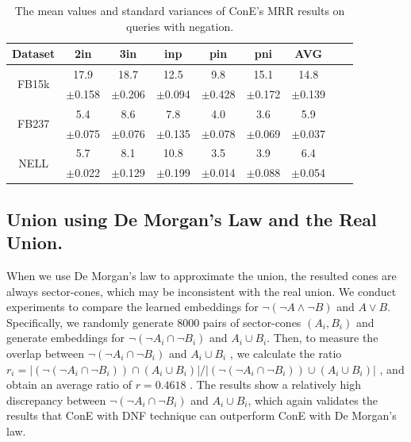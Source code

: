 \documentclass{article}
\newcommand{\std}[1]{\tiny{$\pm$#1}}
\begin{document}
\begin{table}[ht]
    \centering
    \caption{The mean values and standard variances of ConE's MRR results on queries with negation.}
    \label{table:errorbar_neg}
    \vspace{1mm}
    \begin{tabular}{ c  c c c c  c c c c }
        \toprule
         \textbf{Dataset}  &\textbf{2in} &\textbf{3in} &\textbf{inp} &\textbf{pin} &\textbf{pni} &\textbf{AVG}\\
        \midrule
        \multirow{2}{*}{FB15k} 
        &17.9 &18.7 &12.5 &9.8 &15.1 &14.8\\
        &\std{0.158} &\std{0.206} &\std{0.094} &\std{0.428} &\std{0.172} &\std{0.139}\\
        \midrule
        \multirow{2}{*}{FB237}
        &5.4 &8.6 &7.8 &4.0 &3.6 &5.9\\
        &\std{0.075} &\std{0.076} &\std{0.135} &\std{0.078} &\std{0.069} &\std{0.037}\\
        \midrule
        \multirow{2}{*}{NELL} 
        &5.7 &8.1 &10.8 &3.5 &3.9 &6.4\\
        &\std{0.022} &\std{0.129} &\std{0.199} &\std{0.014} &\std{0.088} &\std{0.054}\\
        \bottomrule
    \end{tabular}
    
\end{table}


\subsection{Union using De Morgan's Law and the Real Union.}
When we use De Morgan's law to approximate the union, the resulted cones are always sector-cones, which may be inconsistent with the real union. We conduct experiments to compare the learned embeddings for $\neg (\neg A\land \neg B)$  and $A\lor B$. Specifically, we randomly generate $8000$  pairs of sector-cones $(A_i, B_i)$  and generate embeddings for $\neg (\neg A_i\cap \neg B_i)$  and $A_i\cup B_i$. Then, to measure the overlap between $\neg (\neg A_i\cap \neg B_i)$  and $A_i\cup B_i$ , we calculate the ratio $r_i=|(\neg (\neg A_i\cap\neg B_i))\cap(A_i\cup B_i) |/|(\neg (\neg A_i\cap\neg B_i))\cup(A_i\cup  B_i)|$ , and obtain an average ratio of $r=0.4618$ . The results show a relatively high discrepancy between $\neg (\neg A_i\cap \neg B_i)$  and $A_i\cup B_i$, which again validates the results that ConE with DNF technique can outperform ConE with De Morgan’s law.
\end{document}
